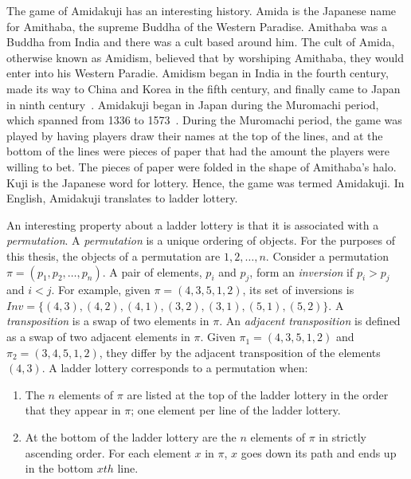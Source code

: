 The game of Amidakuji has an interesting history. Amida is the Japanese name 
for Amithaba, the supreme Buddha of the Western Paradise. Amithaba
was a Buddha from India and there was a cult based around him. The cult 
of Amida, otherwise known as Amidism, believed that by worshiping Amithaba, they would 
enter into his Western Paradie. Amidism began in India in the fourth century,
made its way to China and Korea in the fifth century, and finally came 
to Japan in ninth century~\cite{A0}. Amidakuji began in Japan during 
the Muromachi period, which spanned from
1336 to 1573~\cite{A0}. During the Muromachi period, the game was played by having
players draw their names at the top of the lines, and at the bottom 
of the lines were pieces of paper that had the amount the players
were willing to bet. The pieces of paper were folded in the shape of 
Amithaba's halo. Kuji is the Japanese word for lottery. Hence, the game 
was termed Amidakuji. In English, Amidakuji translates to ladder lottery. 

An interesting property about a ladder lottery is that it is  
associated with a \emph{permutation}. A \emph{permutation} is a unique ordering of objects. 
For the purposes of this thesis, the objects of a permutation are $1,2, \dots ,n$. 
Consider a permutation $\pi=(p_{1},p_{2}, \dots ,p_{n})$.
A pair of elements, $p_{i}$ and $p_{j}$, form an \emph{inversion} if $p_{i}>p_{j}$ and $i<j$. 
For example, given $\pi=(4,3,5,1,2)$, its set of inversions is \newline $Inv=\{(4,3),(4,2),(4,1),(3,2),(3,1),(5,1),(5,2)\}$.
A \emph{transposition} is a swap of two elements in $\pi$.
An \emph{adjacent transposition} is defined as a swap of two adjacent elements in $\pi$.
Given $\pi_{1}=(4,3,5,1,2)$ and $\pi_{2}=(3,4,5,1,2)$, they differ by the adjacent 
transposition of the elements $(4,3)$.
A ladder lottery corresponds to a permutation when:
\begin{enumerate}
	\item The $n$ elements of $\pi$ are listed at the top of the ladder lottery in the order that they appear in 
	$\pi$; one element per line of the ladder lottery.
	\item At the bottom of the ladder lottery are the $n$ elements of $\pi$ in strictly ascending order. For 
	each element $x$ in $\pi$, $x$ goes down its path and ends up in the bottom $xth$ line. 
\end{enumerate} 

